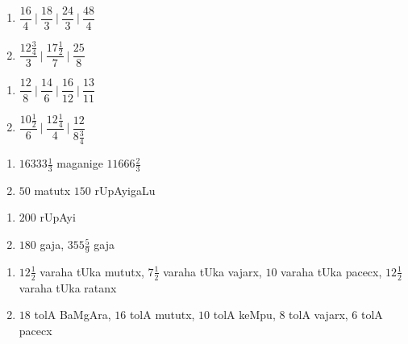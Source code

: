 
\begin{multicols}{2}
\begin{enumerate}[$(1)$]
\item $\dfrac{16}{4}~\bigg|~ \dfrac{18}{3} ~\bigg|~ \dfrac{24}{3}~\bigg|~ 
\dfrac{48}{4}$ 
\item $ \dfrac{12\frac{3}{4}}{3}~\bigg|~ \dfrac{17\frac{1}{2}}{7} ~\bigg|~\dfrac{25}{8}$ 
\end{enumerate}
\end{multicols}


\begin{multicols}{2}
\begin{enumerate}[$(1)$]
\item $\dfrac{12}{8}~\bigg|~ \dfrac{14}{6} ~\bigg|~ \dfrac{16}{12}~\bigg|~ 
\dfrac{13}{11}$ 
\item $ \dfrac{10\frac{1}{2}}{6}~\bigg|~ \dfrac{12\frac{1}{4}}{4} ~\bigg|~\dfrac{12}{8\frac{3}{4}}$ 
\end{enumerate}
\end{multicols}

\newpage
{}

\begin{multicols}{2}
\begin{enumerate}[$(1)$]
\item $16333\frac{1}{3}$ maganige $11666\frac{2}{3}$
\item $50$ matutx $150$ rUpAyigaLu
\end{enumerate}
\end{multicols}


\begin{multicols}{2}
\begin{enumerate}[$(1)$]
\item $200$ rUpAyi
\item $180$ gaja, $355\frac{5}{9}$ gaja
\end{enumerate}
\end{multicols}


\begin{enumerate}[$(1)$]
\item $12\frac{1}{2}$ varaha tUka mututx, $7 \frac{1}{2}$ varaha tUka
               vajarx, $10$ varaha tUka pacecx, $12\frac{1}{2}$ varaha
               tUka ratanx
\item $18$ tolA BaMgAra, $16$ tolA mututx, $10$ tolA keMpu, $8$ tolA
               vajarx, $6$ tolA pacecx
\end{enumerate}


